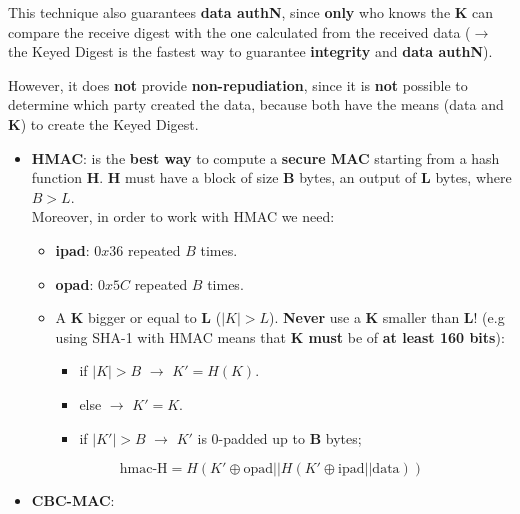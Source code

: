 \noindent
This technique also guarantees \textbf{data authN}, since \textbf{only} who knows the \textbf{K} can compare the receive digest with the one calculated from the received data (\(\rightarrow \) the Keyed Digest is the fastest way to guarantee \textbf{integrity} and \textbf{data authN}).
\vspace{-0.5cm}
\begin{center}
    \begin{quotebox-red}{}
        However, it does \textbf{not} provide \textbf{non-repudiation}, since it is \textbf{not} possible to determine which
        party created the data, because both have the means (data and \textbf{K}) to create the Keyed Digest.
    \end{quotebox-red}   
\end{center}
\begin{itemize}
    \item \textbf{HMAC}: is the \textbf{best way} to compute a \textbf{secure MAC} starting from a hash function \textbf{H}.
    \textbf{H} must have a block of size \textbf{B} bytes, an output of \textbf{L} bytes, where \(B > L\).\\ Moreover, in order to work with HMAC we need:
    \begin{itemize}
        \item \textbf{ipad}: \(0x36\) repeated \(B\) times.
        \item \textbf{opad}: \(0x5C\) repeated \(B\) times.
        \item A \textbf{K} bigger or equal to \textbf{L} (\( |K| > L \)). \textbf{Never} use a \textbf{K} smaller than \textbf{L}! (e.g using SHA-1 with HMAC means that \textbf{K must} be of \textbf{at least 160 bits}):
        \begin{itemize}
            \item if \(|K| > B\) \(\rightarrow \) \(K'=H(K)\).
            \item else \(\rightarrow \) \(K'=K\).
            \item if \(|K'|>B\) \(\rightarrow \) \(K'\) is 0-padded up to \textbf{B} bytes; 
        \end{itemize}
    \end{itemize}
    \[
        \text{hmac-H} = H\left( K' \oplus \text{opad} || H(K' \oplus \text{ipad} || \text{data}) \right)
        \]
    \item \textbf{CBC-MAC}:
\end{itemize}
